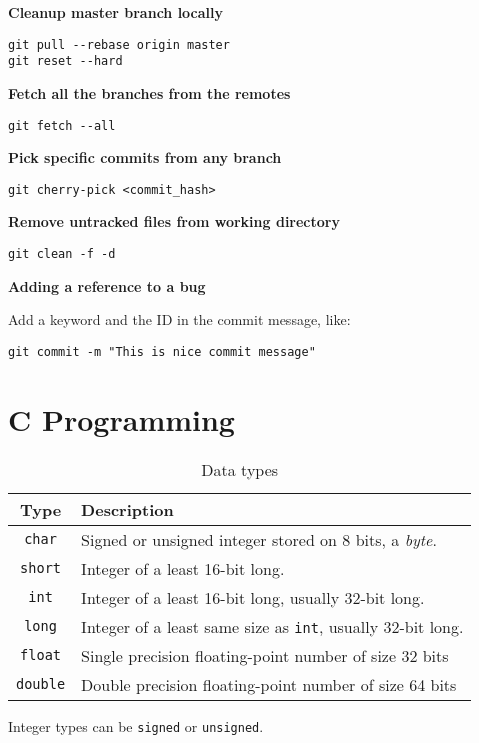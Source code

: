 \documentclass[onecolumn, oneside, a4paper, 11pt]{memoir}
\theoremstyle{remark}
\begin{document}
\textbf{Cleanup master branch locally}

\begin{lstlisting}[style=shell]
git pull --rebase origin master
git reset --hard
\end{lstlisting}

\textbf{Fetch all the branches from the remotes}

\begin{lstlisting}[style=shell]
git fetch --all
\end{lstlisting}

\textbf{Pick specific commits from any branch}

\begin{lstlisting}[style=shell]
git cherry-pick <commit_hash>
\end{lstlisting}

\textbf{Remove untracked files from working directory}

\begin{lstlisting}[style=shell]
git clean -f -d 
\end{lstlisting}

\textbf{Adding a reference to a bug}

Add a keyword and the ID in the commit message, like:
\begin{lstlisting}[style=shell]
git commit -m "This is nice commit message"
\end{lstlisting}

\newpage
\section{C Programming}

\begin{table}[h!]
\centering
\caption{Data types}
\begin{tabular}{|c|l|}
  \hline
  Type & Description \\
  \hline
  \texttt{char} & Signed or unsigned integer stored on 8 bits, a \textit{byte}. \\
  \texttt{short} & Integer of a least 16-bit long. \\
  \texttt{int} & Integer of a least 16-bit long, usually 32-bit long. \\
  \texttt{long} & Integer of a least same size as \texttt{int}, usually 32-bit long. \\
  \texttt{float} & Single precision floating-point number of size 32 bits \\
  \texttt{double} & Double precision floating-point number of size 64 bits \\
  \hline
\end{tabular}
\end{table}
Integer types can be \texttt{signed} or \texttt{unsigned}.
\end{document}
